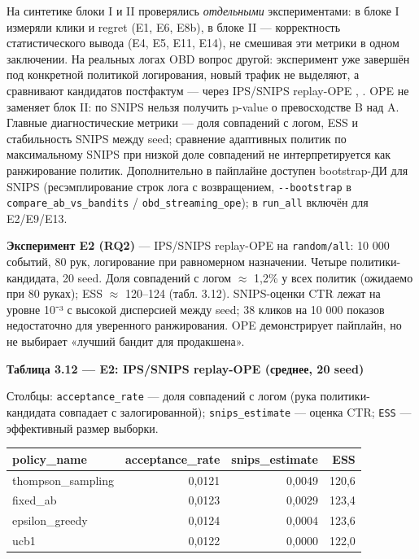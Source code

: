 На синтетике блоки I и II проверялись \emph{отдельными} экспериментами: в блоке I измеряли клики и regret (E1, E6, E8b), в блоке II --- корректность статистического вывода (E4, E5, E11, E14), не смешивая эти метрики в одном заключении. На реальных логах OBD вопрос другой: эксперимент уже завершён под конкретной политикой логирования, новый трафик не выделяют, а сравнивают кандидатов постфактум --- через IPS/SNIPS replay-OPE \cite{ref24}, \cite{ref26}. OPE не заменяет блок II: по SNIPS нельзя получить p-value о превосходстве B над A. Главные диагностические метрики --- доля совпадений с логом, ESS и стабильность SNIPS между seed; сравнение адаптивных политик по максимальному SNIPS при низкой доле совпадений не интерпретируется как ранжирование политик. Дополнительно в пайплайне доступен bootstrap-ДИ для SNIPS (ресэмплирование строк лога с возвращением, \texttt{-\/-bootstrap} в \texttt{compare\_ab\_vs\_bandits} / \texttt{obd\_streaming\_ope}); в \texttt{run\_all} включён для E2/E9/E13.

\textbf{Эксперимент E2 (RQ2)} --- IPS/SNIPS replay-OPE на \texttt{random/all}: 10 000 событий, 80 рук, логирование при равномерном назначении. Четыре политики-кандидата, 20 seed. Доля совпадений с логом $\approx$ 1,2\% у всех политик (ожидаемо при 80 руках); ESS $\approx$ 120--124 (табл. 3.12). SNIPS-оценки CTR лежат на уровне 10⁻³ с высокой дисперсией между seed; 38 кликов на 10 000 показов недостаточно для уверенного ранжирования. OPE демонстрирует пайплайн, но не выбирает «лучший бандит для продакшена».

\textbf{Таблица 3.12 --- E2: IPS/SNIPS replay-OPE (среднее, 20 seed)}

Столбцы: \texttt{acceptance\_rate} --- доля совпадений с логом (рука политики-кандидата совпадает с залогированной); \texttt{snips\_estimate} --- оценка CTR; \texttt{ESS} --- эффективный размер выборки.

\begingroup\footnotesize\setlength{\tabcolsep}{4pt}
\begin{xltabular}{\linewidth}{@{}lrrr@{}}
\toprule\noalign{}
policy\_name & acceptance\_rate & snips\_estimate & ESS \\
\midrule\noalign{}
\endhead
\bottomrule\noalign{}
\endlastfoot
thompson\_sampling & 0,0121 & 0,0049 & 120,6 \\
fixed\_ab & 0,0123 & 0,0029 & 123,4 \\
epsilon\_greedy & 0,0124 & 0,0004 & 123,6 \\
ucb1 & 0,0122 & 0,0000 & 122,0 \\
\end{xltabular}
\endgroup

